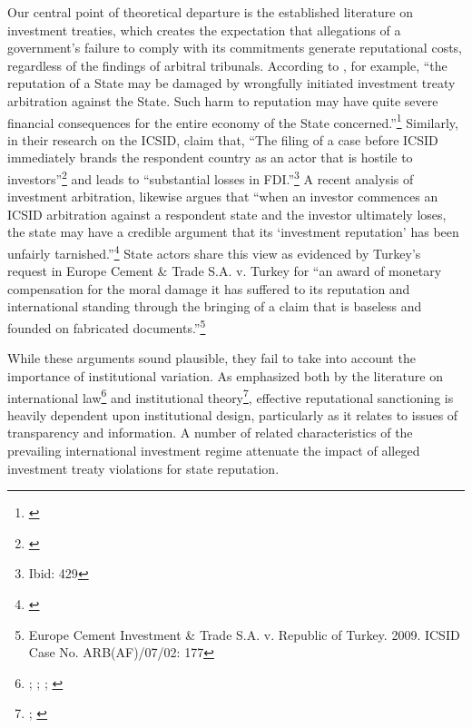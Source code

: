 \documentclass[12pt,onesided]{amsart}
\begin{document}
Our central point of theoretical departure is the established literature on investment treaties, which creates the expectation that allegations of a government's failure to comply with its commitments generate reputational costs, regardless of the findings of arbitral tribunals. According to \citeauthor{schwenzer:hachem:2011}, for example, ``the reputation of a State may be damaged by wrongfully initiated investment treaty arbitration against the State. Such harm to reputation may have quite severe financial consequences for the entire economy of the State concerned.''\footnote{\citet[p. 426]{schwenzer:hachem:2011}} Similarly, in their research on the ICSID, \citeauthor{allee:peinhardt:2011} claim that, ``The filing of a case before ICSID immediately brands the respondent country as an actor that is hostile to investors''\footnote{\citet[p. 414]{allee:peinhardt:2011}} and leads to ``substantial losses in FDI.''\footnote{Ibid: 429} A recent analysis of investment arbitration, likewise argues that ``when an investor commences an ICSID arbitration against a respondent state and the investor ultimately loses, the state may have a credible argument that its `investment reputation' has been unfairly tarnished.''\footnote{\citet[p. 236]{parish2011awarding}} State actors share this view as evidenced by Turkey's request in Europe Cement \& Trade S.A. v. Turkey for ``an award of monetary compensation for the moral damage it has suffered to its reputation and international standing through the bringing of a claim that is baseless and founded on fabricated documents.''\footnote{Europe Cement Investment \& Trade S.A. v. Republic of Turkey. 2009. ICSID Case No. ARB(AF)/07/02: 177} 

While these arguments sound plausible, they fail to take into account the importance of institutional variation. As emphasized both by the literature on international law\footnote{\citet{staton2011judicial}; \citet{cavallaro2008reevaluating}; \citet{guzman2008reputation}; \citet{guzman2008international}} and institutional theory\footnote{\citet[p. 59]{knight1992institutions}; \citet[p. 54--60]{north1990institutions}}, effective reputational sanctioning is heavily dependent upon institutional design, particularly as it relates to issues of transparency and information. A number of related characteristics of the prevailing international investment regime attenuate the impact of alleged investment treaty violations for state reputation. 
\end{document}
